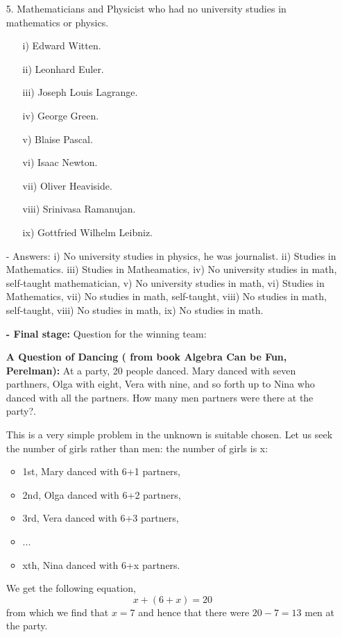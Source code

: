 \documentclass[12pt,spanish]{article}
\begin{document}
\begin{enumerate}
\item[5.] Mathematicians and Physicist who had no university studies in mathematics or physics. 
\begin{enumerate}
\item[i)] Edward Witten.
\item[ii)] Leonhard Euler.
\item[iii)] Joseph Louis Lagrange.
\item[iv)] George Green.
\item[v)] Blaise Pascal.
\item[vi)] Isaac Newton.
\item[vii)] Oliver Heaviside.
\item[viii)] Srinivasa Ramanujan.
\item[ix)] Gottfried Wilhelm Leibniz.
\end{enumerate} 
- Answers: i) No university studies in physics, he was journalist. ii) Studies in Mathematics. iii) Studies in  Matheamatics, iv) No university studies in math, self-taught mathematician, v) No university studies in math, vi) Studies in Mathematics, vii) No studies in math, self-taught, viii) No studies in math, self-taught, viii) No studies in math, ix) No studies in math.

\textbf{- Final stage:}
Question for the winning team: 

\textbf{A Question of Dancing ( from book Algebra Can be Fun, Perelman):} At a party, 20 people danced. Mary danced with seven parthners, Olga with eight, Vera with nine, and so forth up to Nina who danced with all the partners. How many men partners were there at the party?.

 This is a very simple problem in the unknown is suitable chosen. Let us seek the number of girls rather than men: the number of girls is x:
\begin{itemize}
\item 1st, Mary danced with 6+1 partners,
\item 2nd, Olga danced with 6+2 partners,
\item 3rd, Vera danced with 6+3 partners,
\item ...
\item xth, Nina danced with 6+x partners.
\end{itemize}
We get the following equation,
$$
x + (6+x) = 20
$$
from which we find that $x = 7$ and hence that there were $20-7 = 13$ men at the party.
\end{enumerate}
\end{document}
